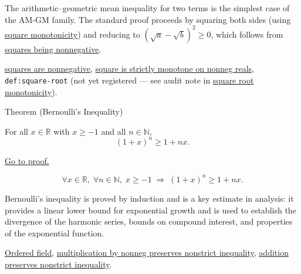 \begin{remark*}[Interpretation]
The arithmetic--geometric mean inequality for two terms is the simplest
case of the AM-GM family.  The standard proof proceeds by squaring both
sides (using
\hyperref[thm:ineq-square-monotone]{square monotonicity}) and reducing
to $(\sqrt{a} - \sqrt{b})^2 \ge 0$, which follows from
\hyperref[prop:product-of-positives-is-positive-q]{squares being nonnegative}.
\end{remark*}

\begin{dependencies}
\hyperref[prop:product-of-positives-is-positive-q]{squares are nonnegative},
\hyperref[thm:ineq-square-monotone]{square is strictly monotone on nonneg reals},
\texttt{def:square-root} (not yet registered --- see audit note in
\hyperref[thm:ineq-square-root-monotone]{square root monotonicity}).
\end{dependencies}


\begin{theorembox}{Theorem (Bernoulli's Inequality)}
\begin{theorem}
\label{thm:ineq-bernoulli}
For all $x \in \mathbb{R}$ with $x \ge -1$ and all $n \in \mathbb{N}$,
\[
  (1 + x)^n \ge 1 + nx.
\]
\end{theorem}
\end{theorembox}



\begin{remark*}[Proof]
\hyperref[prf:ineq-bernoulli]{Go to proof.}
\end{remark*}

\begin{remark*}
\[
  \forall x \in \mathbb{R},\;
  \forall n \in \mathbb{N},\;
  x \ge -1 \;\Rightarrow\;
  (1 + x)^n \ge 1 + nx.
\]
\end{remark*}

\begin{remark*}[Interpretation]
Bernoulli's inequality is proved by induction and is a key estimate in
analysis: it provides a linear lower bound for exponential growth and
is used to establish the divergence of the harmonic series, bounds on
compound interest, and properties of the exponential function.
\end{remark*}

\begin{dependencies}
\hyperref[def:real-ordered-field]{Ordered field},
\hyperref[thm:ineq-nonstrict-multiply-nonneg]{multiplication by nonneg preserves nonstrict inequality},
\hyperref[thm:ineq-nonstrict-add-both-sides]{addition preserves nonstrict inequality}.
\end{dependencies}
